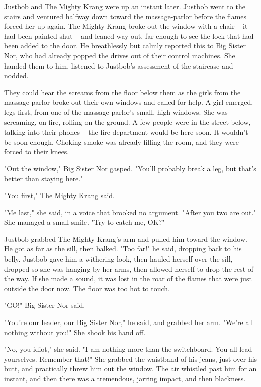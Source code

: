 Justbob and The Mighty Krang were up an instant later. Justbob went
to the stairs and ventured halfway down toward the massage-parlor
before the flames forced her up again. The Mighty Krang broke out
the window with a chair -- it had been painted shut -- and leaned
way out, far enough to see the lock that had been added to the
door. He breathlessly but calmly reported this to Big Sister Nor,
who had already popped the drives out of their control machines.
She handed them to him, listened to Justbob's assessment of the
staircase and nodded.

They could hear the screams from the floor below them as the girls
from the massage parlor broke out their own windows and called for
help. A girl emerged, legs first, from one of the massage parlor's
small, high windows. She was screaming, on fire, rolling on the
ground. A few people were in the street below, talking into their
phones -- the fire department would be here soon. It wouldn't be
soon enough. Choking smoke was already filling the room, and they
were forced to their knees.

"Out the window," Big Sister Nor gasped. "You'll probably break a
leg, but that's better than staying here."

"You first," The Mighty Krang said.

"Me last," she said, in a voice that brooked no argument. "After
you two are out." She managed a small smile. "Try to catch me,
OK?"

Justbob grabbed The Mighty Krang's arm and pulled him toward the
window. He got as far as the sill, then balked. "Too far!" he said,
dropping back to his belly. Justbob gave him a withering look, then
hauled herself over the sill, dropped so she was hanging by her
arms, then allowed herself to drop the rest of the way. If she made
a sound, it was lost in the roar of the flames that were just
outside the door now. The floor was too hot to touch.

"GO!" Big Sister Nor said.

"You're our leader, our Big Sister Nor," he said, and grabbed her
arm. "We're all nothing without you!" She shook his hand off.

"No, you idiot," she said. "I am nothing more than the switchboard.
You all lead yourselves. Remember that!" She grabbed the waistband
of his jeans, just over his butt, and practically threw him out the
window. The air whistled past him for an instant, and then there
was a tremendous, jarring impact, and then blackness.


